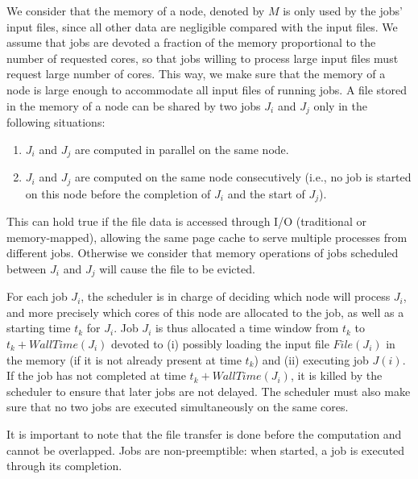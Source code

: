 \documentclass[sigconf,review,anonymous]{acmart}
\newcommand{\Node}[1]{\ensuremath{\mathrm{Node}_{#1}}\xspace}
\newcommand{\file}{\ensuremath{\mathit{File}}\xspace}
\newcommand{\storage}{\ensuremath{\mathit{Storage}}\xspace}
\newcommand{\size}{\ensuremath{\mathit{Size}}\xspace}
\newcommand{\memory}{\ensuremath{\mathit{M}}\xspace}
\newcommand{\walltime}{\mathit{WallTime}\xspace}
\begin{document}
We consider that the memory of a node, denoted by
$\memory$ is only used by the jobs' input files, since all other data are
negligible compared with the input files. We assume that jobs are
devoted a fraction of the memory proportional to the number of
requested cores, so that jobs willing to process large input files
must request large number of cores. This way, we make sure that the
memory of a node is large enough to accommodate all input files of running jobs.
A file stored in the memory of a node can be shared by two jobs $J_i$ and $J_j$ only in the following situations:
\begin{enumerate}
	\item $J_i$ and $J_j$ are computed in parallel on the same node.
	\item $J_i$ and $J_j$ are computed on the same node
          consecutively (i.e., no job is started on this node before the
          completion of $J_i$ and the start of $J_j$).
\end{enumerate}
This can hold true if the file data is accessed through I/O (traditional or memory-mapped),
allowing the same page cache to serve multiple processes from different jobs.
Otherwise we consider that memory operations of jobs scheduled between
$J_i$ and $J_j$ will cause the file to be evicted.


For each job $J_i$, the scheduler is in charge of deciding which node
will process $J_i$, and more precisely which cores of this node
are allocated to the job, as well as a starting time $t_k$ for $J_i$. Job
$J_i$ is thus allocated a time window from $t_k$ to
$t_k+\walltime(J_i)$ devoted to (i) possibly loading the input file
$\file(J_i)$ in the memory (if it is not already present at time
$t_k$) and (ii) executing job $J(i)$. If the job has not completed at
time $t_k+\walltime(J_i)$, it is killed by the scheduler to ensure
that later jobs are not delayed.  The scheduler must also make sure
that no two jobs are executed simultaneously on the same cores.

It is important to note that the file transfer is done before the computation and cannot be overlapped.
Jobs are non-preemptible: when started, a job is executed through its completion.
\end{document}
